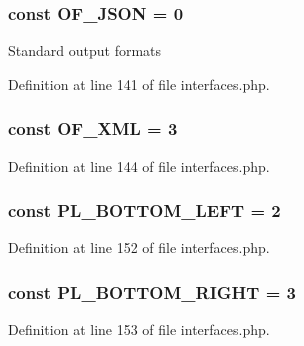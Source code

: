 \hypertarget{interfaceIXLUIHelper_ae216f8dc124162fce9c831581cccad38}{
\subsubsection[{OF\_\-JSON}]{\setlength{\rightskip}{0pt plus 5cm}const {\bf OF\_\-JSON} = 0}}
\label{interfaceIXLUIHelper_ae216f8dc124162fce9c831581cccad38}
Standard output formats 

Definition at line 141 of file interfaces.php.

\hypertarget{interfaceIXLUIHelper_a3a27aba2d308cba737ac8177f210b547}{
\subsubsection[{OF\_\-XML}]{\setlength{\rightskip}{0pt plus 5cm}const {\bf OF\_\-XML} = 3}}
\label{interfaceIXLUIHelper_a3a27aba2d308cba737ac8177f210b547}


Definition at line 144 of file interfaces.php.

\hypertarget{interfaceIXLUIHelper_a01a4f4dcd309a862d2489734b17b6d29}{
\subsubsection[{PL\_\-BOTTOM\_\-LEFT}]{\setlength{\rightskip}{0pt plus 5cm}const {\bf PL\_\-BOTTOM\_\-LEFT} = 2}}
\label{interfaceIXLUIHelper_a01a4f4dcd309a862d2489734b17b6d29}


Definition at line 152 of file interfaces.php.

\hypertarget{interfaceIXLUIHelper_ac1425b823028e19f350a752e8bb08000}{
\subsubsection[{PL\_\-BOTTOM\_\-RIGHT}]{\setlength{\rightskip}{0pt plus 5cm}const {\bf PL\_\-BOTTOM\_\-RIGHT} = 3}}
\label{interfaceIXLUIHelper_ac1425b823028e19f350a752e8bb08000}


Definition at line 153 of file interfaces.php.

